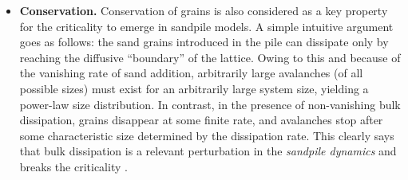 \documentclass[11pt,a4paper]{book}
\begin{document}
\begin{itemize}
%
\item
\textbf{Conservation.} Conservation of grains is also considered as a key property for the
criticality to emerge in sandpile models. A simple intuitive argument
goes as follows: the sand grains introduced in the pile can dissipate only by
reaching the diffusive ``boundary'' of the lattice. Owing to this and
because of the vanishing rate of sand addition, arbitrarily large
avalanches (of all possible sizes) must exist for an arbitrarily large
system size, yielding a power-law size distribution. In contrast, in
the presence of non-vanishing bulk dissipation, grains disappear at
some finite rate, and avalanches stop after some characteristic size
determined by the dissipation rate. This clearly says that bulk
dissipation is a relevant perturbation in the \textit{sandpile
dynamics} and breaks the criticality \cite{bonachela1}. 


\end{itemize}
\end{document}
